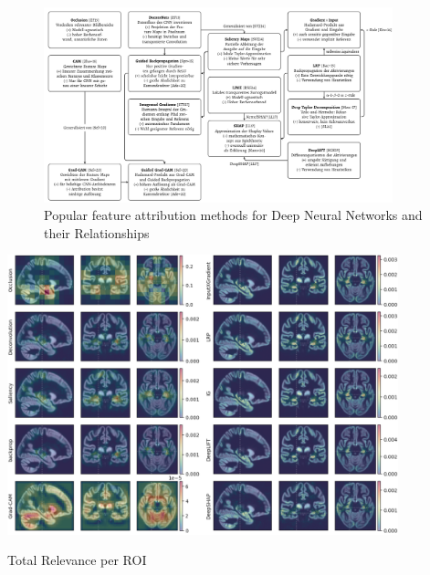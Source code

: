 \documentclass[aspectratio=169,xcolor={table, dvipsnames}]{beamer}
\begin{document}
\begin{frame}[plain]
	\begin{figure}
		\centering
		\includegraphics[width=0.9\textwidth]{figures/overview.png}
		\caption*{Popular feature attribution methods for Deep Neural Networks and their Relationships}
	\end{figure}
\end{frame}

\begin{frame}[plain]
	\centering
	\includegraphics[width=0.85\textwidth]{figures/3672-relevance-maps.png}
\end{frame}

\begin{frame}{Total Relevance per ROI}
	
\end{frame}
\end{document}
